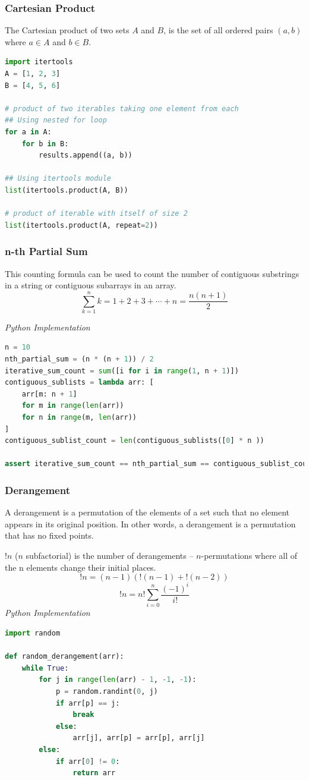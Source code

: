 \documentclass{article}
\begin{document}
    \subsubsection{Cartesian Product}
    The Cartesian product of two sets $A$ and $B$, is the set of all ordered pairs $(a, b)$ where $a \in A$ and $b \in B$.

\begin{lstlisting}[language=Python]
import itertools
A = [1, 2, 3]
B = [4, 5, 6]

# product of two iterables taking one element from each
## Using nested for loop
for a in A: 
    for b in B:
        results.append((a, b))

## Using itertools module
list(itertools.product(A, B))

# product of iterable with itself of size 2
list(itertools.product(A, repeat=2))
\end{lstlisting}

    \subsubsection{n-th Partial Sum}
    This counting formula can be used to count the number of contiguous substrings in a string or contiguous subarrays in an array.
    \[
        \sum_{k=1}^n k = 1 + 2 + 3 + \cdots + n = \frac{n(n+1)}{2} 
    \]
    
\vspace{8pt} \emph{Python Implementation}
\begin{lstlisting}[language=Python]
n = 10
nth_partial_sum = (n * (n + 1)) / 2 
iterative_sum_count = sum([i for i in range(1, n + 1)])
contiguous_sublists = lambda arr: [
    arr[m: n + 1] 
    for m in range(len(arr)) 
    for n in range(m, len(arr))
]
contiguous_sublist_count = len(contiguous_sublists([0] * n ))

assert iterative_sum_count == nth_partial_sum == contiguous_sublist_count
\end{lstlisting}

    \subsubsection{Derangement}
    A derangement is a permutation of the elements of a set such that no element appears in its original position. In other words, a derangement is a permutation that has no fixed points.
    
    $!n$ ($n$ subfactorial) is the number of derangements -- $n$-permutations where all of the n elements change their initial places.
    \[
        !n=(n-1)({!(n-1)}+{!(n-2)})
    \]
    \[
        !n=n!\sum_{i=0}^{n}{\frac {(-1)^{i}}{i!}}
    \]
\vspace{8pt} \emph{Python Implementation}
\begin{lstlisting}[language=Python]
import random

def random_derangement(arr):
    while True:
        for j in range(len(arr) - 1, -1, -1):
            p = random.randint(0, j)
            if arr[p] == j:
                break
            else:
                arr[j], arr[p] = arr[p], arr[j]
        else:
            if arr[0] != 0:
                return arr
\end{lstlisting}
\end{document}
